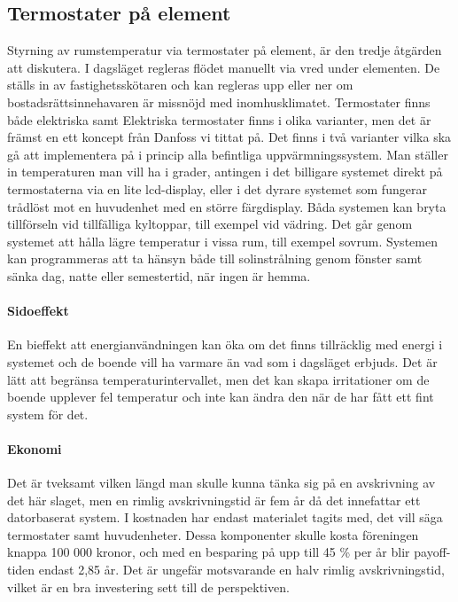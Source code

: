 \subsection{Termostater på element}
Styrning av rumstemperatur via termostater på element, är den tredje åtgärden att diskutera. I dagsläget regleras flödet manuellt via vred under elementen. De ställs in av fastighetsskötaren och kan regleras upp eller ner om bostadsrättsinnehavaren är missnöjd med inomhusklimatet. Termostater finns både elektriska samt 
Elektriska termostater finns i olika varianter, men det är främst en ett koncept från Danfoss vi tittat på. Det finns i två varianter vilka ska gå att implementera på i princip alla befintliga uppvärmningssystem. Man ställer in temperaturen man vill ha i grader, antingen i det billigare systemet direkt på termostaterna via en lite lcd-display, eller i det dyrare systemet som fungerar trådlöst mot en huvudenhet med en större färgdisplay.
Båda systemen kan bryta tillförseln vid tillfälliga kyltoppar, till exempel vid vädring. Det går genom systemet att hålla lägre temperatur i vissa rum, till exempel sovrum. Systemen kan programmeras att ta hänsyn både till solinstrålning genom fönster samt sänka dag, natte eller semestertid, när ingen är hemma.

\paragraph{Sidoeffekt}
En bieffekt att energianvändningen kan öka om det finns tillräcklig med energi i systemet och de boende vill ha varmare än vad som i dagsläget erbjuds. Det är lätt att begränsa temperaturintervallet, men det kan skapa irritationer om de boende upplever fel temperatur och inte kan ändra den när de har fått ett fint system för det.

\paragraph{Ekonomi}
Det är tveksamt vilken längd man skulle kunna tänka sig på en avskrivning av det här slaget, men en  rimlig avskrivningstid är fem år då det innefattar ett datorbaserat system. I kostnaden har endast materialet tagits med, det vill säga termostater samt huvudenheter. Dessa komponenter skulle kosta föreningen knappa 100 000 kronor, och med en besparing på upp till 45 \% per år blir payoff-tiden endast 2,85 år. Det är ungefär motsvarande en halv rimlig avskrivningstid, vilket är en bra investering sett till de perspektiven.

